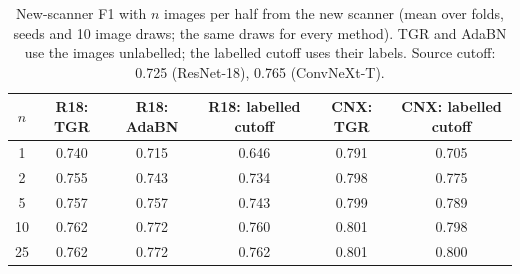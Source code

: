 \begin{table}[htbp]
{\caption{New-scanner F1 with $n$ images per half from the new scanner (mean over folds, seeds and 10 image draws; the same draws for every method). TGR and AdaBN use the images unlabelled; the labelled cutoff uses their labels. Source cutoff: 0.725 (ResNet-18), 0.765 (ConvNeXt-T).}}
{%
\footnotesize
\setlength{\tabcolsep}{5pt}
\begin{tabular}{@{}cccccc@{}}
\toprule
$n$ & R18: TGR & R18: AdaBN & R18: labelled cutoff & CNX: TGR & CNX: labelled cutoff \\
\midrule
1 & 0.740 & 0.715 & 0.646 & 0.791 & 0.705 \\
2 & 0.755 & 0.743 & 0.734 & 0.798 & 0.775 \\
5 & 0.757 & 0.757 & 0.743 & 0.799 & 0.789 \\
10 & 0.762 & 0.772 & 0.760 & 0.801 & 0.798 \\
25 & 0.762 & 0.772 & 0.762 & 0.801 & 0.800 \\
\bottomrule
\end{tabular}
}
\end{table}
